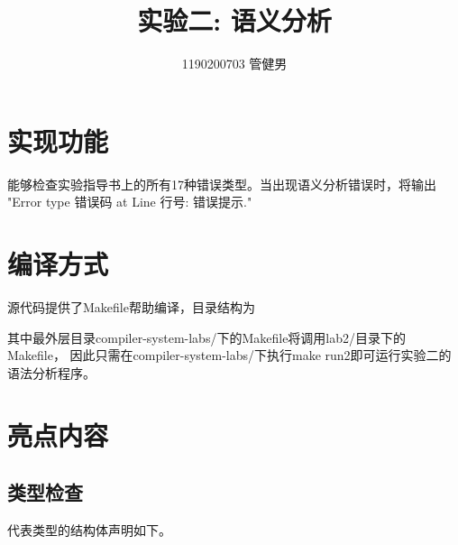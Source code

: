 \documentclass{article}
\title{实验二: 语义分析}
\author{1190200703 管健男}
\date{}
\begin{document}
\maketitle


\section{实现功能}

能够检查实验指导书上的所有17种错误类型。当出现语义分析错误时，将输出
"Error type 错误码 at Line 行号: 错误提示."

\section{编译方式}

源代码提供了Makefile帮助编译，目录结构为

\begin{figure}[H]
    \centering
    \begin{minipage}{0.4\linewidth}
    \end{minipage}
\end{figure}

其中最外层目录compiler-system-labs/下的Makefile将调用lab2/目录下的Makefile，
因此只需在compiler-system-labs/下执行make run2即可运行实验二的语法分析程序。

\section{亮点内容}

\subsection{类型检查}

代表类型的结构体声明如下。
\end{document}
